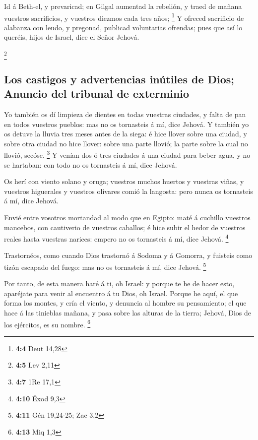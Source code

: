  Id á Beth-el, y prevaricad; en Gilgal aumentad la
rebelión, y traed de mañana vuestros sacrificios, y vuestros diezmos
cada tres años; \footnote{\textbf{4:4} Deut 14,28}  Y
ofreced sacrificio de alabanza con leudo, y pregonad, publicad
voluntarias ofrendas; pues que así lo queréis, hijos de Israel, dice el
Señor Jehová.

\footnote{\textbf{4:5} Lev 2,11}

\hypertarget{los-castigos-y-advertencias-inuxfatiles-de-dios-anuncio-del-tribunal-de-exterminio}{%
\subsection{Los castigos y advertencias inútiles de Dios; Anuncio del
tribunal de
exterminio}\label{los-castigos-y-advertencias-inuxfatiles-de-dios-anuncio-del-tribunal-de-exterminio}}

 Yo también os dí limpieza de dientes en todas vuestras
ciudades, y falta de pan en todos vuestros pueblos: mas no os tornasteis
á mí, dice Jehová.  Y también yo os detuve la lluvia tres
meses antes de la siega: é hice llover sobre una ciudad, y sobre otra
ciudad no hice llover: sobre una parte llovió; la parte sobre la cual no
llovió, secóse. \footnote{\textbf{4:7} 1Re 17,1}  Y venían
dos ó tres ciudades á una ciudad para beber agua, y no se hartaban: con
todo no os tornasteis á mí, dice Jehová.

 Os herí con viento solano y oruga; vuestros muchos
huertos y vuestras viñas, y vuestros higuerales y vuestros olivares
comió la langosta: pero nunca os tornasteis á mí, dice Jehová.

 Envié entre vosotros mortandad al modo que en Egipto:
maté á cuchillo vuestros mancebos, con cautiverio de vuestros caballos;
é hice subir el hedor de vuestros reales hasta vuestras narices: empero
no os tornasteis á mí, dice Jehová. \footnote{\textbf{4:10} Éxod 9,3}

 Trastornéos, como cuando Dios trastornó á Sodoma y á
Gomorra, y fuisteis como tizón escapado del fuego: mas no os tornasteis
á mí, dice Jehová. \footnote{\textbf{4:11} Gén 19,24-25; Zac 3,2}

 Por tanto, de esta manera haré á ti, oh Israel: y porque
te he de hacer esto, aparéjate para venir al encuentro á tu Dios, oh
Israel.  Porque he aquí, el que forma los montes, y cría
el viento, y denuncia al hombre su pensamiento; el que hace á las
tinieblas mañana, y pasa sobre las alturas de la tierra; Jehová, Dios de
los ejércitos, es su nombre. \footnote{\textbf{4:13} Miq 1,3}

